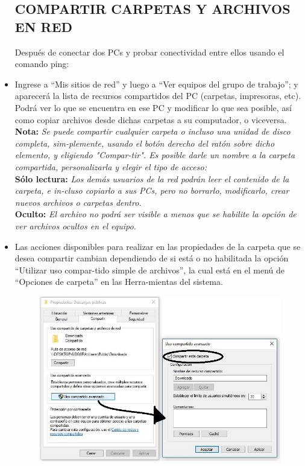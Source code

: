 \documentclass[journal]{IEEEtran}
\begin{document}
\begin{itemize}
\subsection{COMPARTIR CARPETAS Y ARCHIVOS EN RED}
Después de conectar dos PCs y probar conectividad entre ellos usando el comando ping:
\item Ingrese a “Mis sitios de red” y luego a “Ver equipos del grupo de trabajo”; y
aparecerá la lista de recursos compartidos del PC (carpetas, impresoras, etc). Podrá ver lo que se encuentra en ese PC y modificar lo que sea posible, así como copiar archivos desde dichas carpetas a su computador, o viceversa.\\
\textbf{Nota:}
\textit{Se puede compartir cualquier carpeta o incluso una unidad de disco completa, sim-plemente, usando el botón derecho del ratón sobre dicho elemento, y eligiendo "Compar-tir". Es posible darle un nombre a la carpeta compartida, personalizarla y elegir el tipo de acceso:}\\
\textbf{Sólo lectura:}
\textit{ Los demás usuarios de la red podrán leer el contenido de la carpeta, e in-cluso copiarlo a sus PCs, pero no borrarlo, modificarlo, crear nuevos archivos o carpetas dentro.}\\
\textbf{Oculto:}
\textit{El archivo no podrá ser visible a menos que se habilite la opción de ver archivos ocultos en el equipo.}\\
\item  Las acciones disponibles para realizar en las propiedades de la carpeta que se desea compartir cambian dependiendo de si está o no habilitada la opción “Utilizar uso compar-tido simple de archivos”, la cual está en el menú de “Opciones de carpeta” en las Herra-mientas del sistema.
\begin{center}
\begin{figure}[H]
\centering
\includegraphics[scale=0.5]{10.JPG} 

\end{figure}
\end{center}
\end{itemize}
\end{document}
